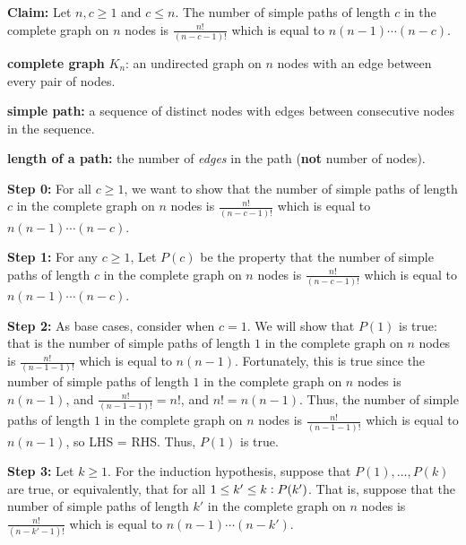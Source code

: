 \documentclass{article}
\begin{document}
\textbf{Claim:} Let $n,c\geq 1$ and $c\leq n$. The number of simple paths of length $c$ in the complete graph on $n$ nodes is $\frac{n!}{(n-c-1)!}$ which is equal to $n(n-1)\cdots (n-c)$.

\vspace{10pt}

\textbf{complete graph} $K_n$: an undirected graph on $n$ nodes with an edge between every pair of nodes.
\vspace{5pt}

\textbf{simple path:} a sequence of distinct nodes with edges between consecutive nodes in the sequence.
\vspace{5pt}

\textbf{length of a path:} the number of \textit{edges} in the path (\textbf{not} number of nodes).
\vspace{5pt}


\textbf{Step 0:} For all $c\geq 1$, we want to show that the number of simple paths of length $c$ in the complete graph on $n$ nodes is $\frac{n!}{(n-c-1)!}$ which is equal to $n(n-1)\cdots (n-c)$.
\vspace{15pt}

\textbf{Step 1:} For any $c\geq 1$, Let $P(c)$ be the property that the number of simple paths of length $c$ in the complete graph on $n$ nodes is $\frac{n!}{(n-c-1)!}$ which is equal to $n(n-1)\cdots (n-c)$.
\vspace{15pt}

\textbf{Step 2:} As base cases, consider when $c=1$. We will show that $P(1)$ is true: that is the number of simple paths of length $1$ in the complete graph on $n$ nodes is $\frac{n!}{(n-1-1)!}$ which is equal to $n(n-1)$. Fortunately, this is true since the number of simple paths of length $1$ in the complete graph on $n$ nodes is $n(n-1)$, and $\frac{n!}{(n-1-1)!}=n!$, and $n!=n(n-1)$. Thus, the number of simple paths of length $1$ in the complete graph on $n$ nodes is $\frac{n!}{(n-1-1)!}$ which is equal to $n(n-1)$, so LHS = RHS. Thus, $P(1)$ is true.
\vspace{15pt}


\textbf{Step 3:} Let $k\geq 1$. For the induction hypothesis, suppose that $P(1),\ldots,P(k)$ are true, or equivalently, that for all $1\leq k'\leq k\vcentcolon P(k')$. That is, suppose that the number of simple paths of length $k'$ in the complete graph on $n$ nodes is $\frac{n!}{(n-k'-1)!}$ which is equal to $n(n-1)\cdots (n-k')$.


\pagebreak
\end{document}
